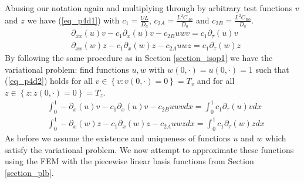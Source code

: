 \documentclass[11pt,fleqn]{article}
\theoremstyle{defstyle}
\begin{document}
Abusing our notation again and multiplying through by arbitrary test functions $v$ and $z$ we have (\ref{eq_p4d1}) with $c_1 = \frac{UL}{D_a}$,  $c_{2A} = \frac{L^2C_{A0}}{D_a}$ and  $c_{2B} = \frac{L^2C_{B0}}{D_a}$.
\begin{equation}
\begin{aligned}
&\partial_{xx}(u)v - c_1\partial_x(u)v - c_{2B}uwv = c_1\partial_\tau(u)v \\
&\partial_{xx}(w)z - c_1\partial_x(w)z - c_{2A}uwz = c_1\partial_\tau(w)z 
\end{aligned}
\label{eq_p4d1}
\end{equation}
By following the same procedure as in Section \ref{section_isop1} we have the variational problem: find functions $u, w$ with $w(0,\cdot)=u(0,\cdot)=1$ such that (\ref{eq_p4d2}) holds for all $v \in \left\{v : v(0,\cdot) = 0 \right\} = T_v$ and for all $z \in \left\{z : z(0,\cdot) = 0 \right\} = T_z$.
\begin{equation}
\begin{aligned}
&\int_0^1 -\partial_{x}(u)v - c_1\partial_x(u)v - c_{2B}uwvdx = \int_0^1 c_1\partial_\tau(u)v dx \\
&\int_0^1-\partial_{x}(w)z - c_1\partial_x(w)z - c_{2A}uwzdx = \int_0^1 c_1\partial_\tau(w)zdx 
\end{aligned}
\label{eq_p4d2}
\end{equation}
As before we assume the existence and uniqueness of functions $u$ and $w$ which satisfy the variational problem. We now attempt to approximate these functions using the FEM with the piecewise linear basis functions from Section \ref{section_plb}. 
\end{document}
